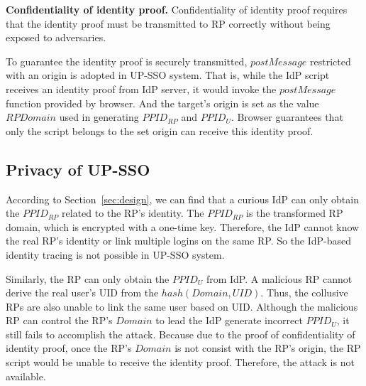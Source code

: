 \vspace{1mm}\noindent\textbf{Confidentiality of identity proof.}
Confidentiality of identity proof requires that the identity proof must be transmitted to RP correctly without being exposed to adversaries.

To guarantee the identity proof is securely transmitted, $postMessage$ restricted with an origin is adopted in UP-SSO system. That is, while the IdP script receives an identity proof from IdP server, it would invoke the $postMessage$ function provided by browser. And the target's origin is set as the value $RPDomain$ used in generating $PPID_{RP}$ and $PPID_U$. Browser guarantees that only the script belongs to the set origin can receive this identity proof.




\subsection{Privacy of UP-SSO}
According to Section~\ref{sec:design}, we can find that a curious IdP can only obtain the $PPID_{RP}$ related to the RP's identity. The $PPID_{RP}$ is the transformed RP domain, which is encrypted with a one-time key. Therefore, the IdP cannot know the real RP's identity or link multiple logins on the same RP. So the IdP-based identity tracing is not possible in UP-SSO system. 

Similarly, the RP can only obtain the $PPID_U$ from IdP. A malicious RP cannot derive the real user's UID from the $hash(Domain, UID)$. Thus, the collusive RPs are also unable to link the same user based on UID. Although the malicious RP can control the RP's $Domain$ to lead the IdP generate incorrect $PPID_U$, it still fails to accomplish the attack. Because due to the proof of confidentiality of identity proof, once the RP's $Domain$ is not consist with the RP's origin, the RP script would be unable to receive the identity proof. Therefore, the attack is not available. 

